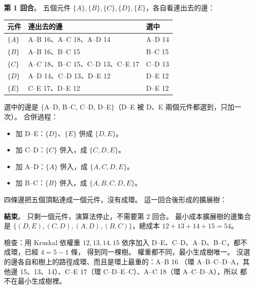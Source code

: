 \begin{pastsoln}
\textbf{第 1 回合}。 五個元件 $\{A\}, \{B\}, \{C\}, \{D\}, \{E\}$，各自看連出去的邊：
\begin{center}
\small
\begin{tabular}{lll}
\toprule
元件 & 連出去的邊 & 選中 \\
\midrule
$\{A\}$ & A--B 16、A--C 18、A--D 14 & A--D 14 \\
$\{B\}$ & A--B 16、B--C 15 & B--C 15 \\
$\{C\}$ & A--C 18、B--C 15、C--D 13、C--E 17 & C--D 13 \\
$\{D\}$ & A--D 14、C--D 13、D--E 12 & D--E 12 \\
$\{E\}$ & C--E 17、D--E 12 & D--E 12 \\
\bottomrule
\end{tabular}
\end{center}
選中的邊是 $\{$A--D, B--C, C--D, D--E$\}$（D--E 被 D、E 兩個元件都選到，只加一次）。 合併過程：
\begin{itemize}
\item 加 D--E：$\{D\}$、$\{E\}$ 併成 $\{D, E\}$。
\item 加 C--D：$\{C\}$ 併入，成 $\{C, D, E\}$。
\item 加 A--D：$\{A\}$ 併入，成 $\{A, C, D, E\}$。
\item 加 B--C：$\{B\}$ 併入，成 $\{A, B, C, D, E\}$。
\end{itemize}
四條邊把五個頂點連成一個元件，沒有成環。 這一回合後形成的擴展樹：
\begin{center}
\end{center}

\textbf{結束}。 只剩一個元件，演算法停止，不需要第 2 回合。 最小成本擴展樹的邊集合是
$\{(D, E), (C, D), (A, D), (B, C)\}$，總成本 $12 + 13 + 14 + 15 = 54$。

檢查：用 Kruskal 依權重 $12, 13, 14, 15$ 依序加入 D--E、C--D、A--D、B--C，都不成環，已經 $4 = 5 - 1$ 條，
得到同一棵樹。 權重都不同，最小生成樹唯一。 沒選的邊各自和樹上的路徑成環、而且是環上最重的：A--B 16
（環 A--B--C--D--A，其他邊 15、13、14）、C--E 17（環 C--D--E--C）、A--C 18（環 A--C--D--A），所以
都不在最小生成樹裡。
\end{pastsoln}
